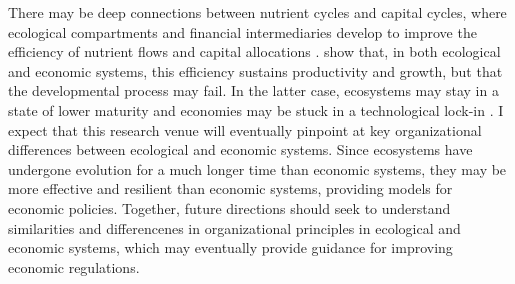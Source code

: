% 
% 
% 
There may be deep connections between nutrient cycles and capital cycles, where ecological compartments and financial intermediaries develop to improve the efficiency of nutrient flows and capital allocations \citep{Odum1969}.
% 
\cite{Veldhuis2018,King1993} show that, in both ecological and economic systems, this efficiency sustains productivity and growth, but that the developmental process may fail. In the latter case, ecosystems may stay in a state of lower maturity \citep{Margalef1963} and economies may be stuck in a technological lock-in \citep{Hidalgo2009}. 
% 
% 
% 
% 
I expect that this research venue will eventually pinpoint at key organizational differences between ecological and economic systems. Since ecosystems have undergone evolution for a much longer time than economic systems, they may be more effective and resilient than economic systems, providing models for economic policies.
% 
% 
% 
% 
% 
Together, future directions should seek to understand similarities and differencenes in organizational principles in ecological and economic systems, which may eventually provide guidance for improving economic regulations.

%   

